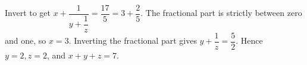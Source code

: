 Invert to get $x+\dfrac{1}{y+\dfrac{1}{z}}=\dfrac{17}{5}=3+\dfrac{2}{5}$. The fractional part is strictly between zero and one, so $x=3$. Inverting the fractional part gives $y+\dfrac{1}{z}=\dfrac{5}{2}$. Hence $y=2,z=2$, and $x+y+z=\boxed7$.
